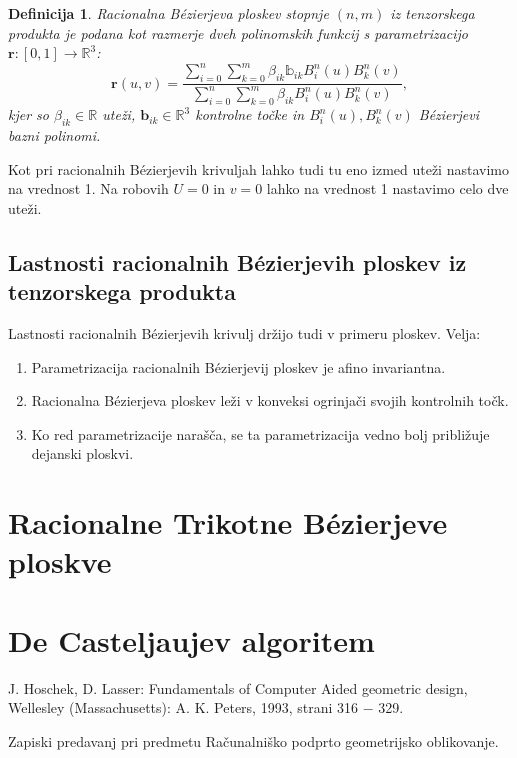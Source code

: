 \documentclass[a4paper,10pt]{article}
\newtheorem{definicija}{Definicija}
\begin{document}
\begin{definicija}
    Racionalna Bézierjeva ploskev stopnje $(n, m)$ iz tenzorskega produkta je podana kot razmerje dveh polinomskih funkcij s parametrizacijo $\mathbf{r}: [0,1] \rightarrow \mathbb{R}^3$:
    $$
    \mathbf{r} (u, v) = \frac{ \sum_{i=0}^{n} \sum_{k=0}^{m} \beta_{ik} \mathbb{b}_{ik} B_i^{n} (u) B_k^{n} (v) }{ \sum_{i=0}^{n} \sum_{k=0}^{m} \beta_{ik} B_i^{n} (u) B_k^{n} (v) } ,
    $$
    kjer so $\beta_{ik} \in \mathbb{R}$ uteži, $\mathbf{b}_{ik} \in \mathbb{R}^3$ kontrolne točke in $B_i^{n} (u), B_k^{n} (v)$ Bézierjevi bazni polinomi.
\end{definicija}

Kot pri racionalnih Bézierjevih krivuljah lahko tudi tu eno izmed uteži nastavimo na vrednost 1. Na robovih $U=0$ in $v=0$ lahko na vrednost 1 nastavimo celo dve uteži.

\subsection{Lastnosti racionalnih Bézierjevih ploskev iz tenzorskega produkta}

Lastnosti racionalnih Bézierjevih krivulj držijo tudi v primeru ploskev. Velja:

\begin{enumerate}
    \item Parametrizacija racionalnih Bézierjevij ploskev je afino invariantna.
    \item Racionalna Bézierjeva ploskev leži v konveksi ogrinjači svojih kontrolnih točk.
    \item Ko red parametrizacije narašča, se ta parametrizacija vedno bolj približuje dejanski ploskvi.
\end{enumerate}

\section{Racionalne Trikotne Bézierjeve ploskve}

\section{De Casteljaujev algoritem}

\begin{thebibliography}{9}
    J. Hoschek, D. Lasser: Fundamentals of Computer Aided geometric design,
    Wellesley (Massachusetts): A. K. Peters, 1993, strani 316 $-$ 329.

    Zapiski predavanj pri predmetu Računalniško podprto geometrijsko oblikovanje.
\end{thebibliography}
\end{document}
